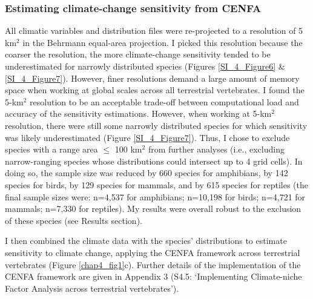 \subsubsection{Estimating climate-change sensitivity from CENFA}
All climatic variables and distribution files were re-projected to a resolution of 5 km$^2$ in the Behrmann equal-area projection. I picked this resolution because the coarser the resolution, the more climate-change sensitivity tended to be underestimated for narrowly distributed species (Figures \ref{SI_4_Figure6} \& \ref{SI_4_Figure7}). However, finer resolutions demand a large amount of memory space when working at global scales across all terrestrial vertebrates. I found the 5-km$^2$ resolution to be an acceptable trade-off between computational load and accuracy of the sensitivity estimations. However, when working at 5-km$^2$ resolution, there were still some narrowly distributed species for which sensitivity was likely underestimated (Figure \ref{SI_4_Figure7}). Thus, I chose to exclude species with a range area $\leq$ 100 km$^2$ from further analyses (i.e., excluding narrow-ranging species whose distributions could intersect up to 4 grid cells). In doing so, the sample size was reduced by 660 species for amphibians, by 142 species for birds, by 129 species for mammals, and by 615 species for reptiles (the final sample sizes were: n=4,537 for amphibians; n=10,198 for birds; n=4,721 for mammals; n=7,330 for reptiles). My results were overall robust to the exclusion of these species (see Results section). 

I then combined the climate data with the species' distributions to estimate sensitivity to climate change, applying the CENFA framework across terrestrial vertebrates (Figure \ref{chap4_fig1}c). Further details of the implementation of the CENFA framework are given in Appendix 3 (S4.5: `Implementing Climate-niche Factor Analysis across terrestrial vertebrates').


